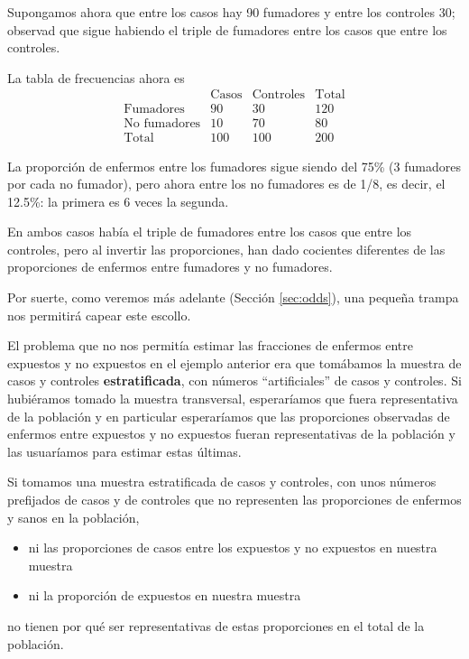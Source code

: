 \documentclass[
]{book}
\providecommand{\tightlist}{%
  \setlength{\itemsep}{0pt}\setlength{\parskip}{0pt}}
\theoremstyle{definition}
\theoremstyle{definition}
\theoremstyle{definition}
\theoremstyle{definition}
\theoremstyle{remark}
\begin{document}
Supongamos ahora que entre los casos hay 90 fumadores y entre los controles 30; observad que sigue habiendo el triple de fumadores entre los casos que entre los controles.

La tabla de frecuencias ahora es
\[
\begin{array}{r|c|c|c}
& \text{Casos} & \text{Controles} & \text{Total} \\ \hline
\text{Fumadores} & 90 & 30 & 120\\ \hline
\text{No fumadores} & 10 & 70 & 80\\ \hline
\text{Total} & 100 & 100 & 200
\end{array}
\]

La proporción de enfermos entre los fumadores sigue siendo del 75\% (3 fumadores por cada no fumador), pero ahora entre los no fumadores es de 1/8, es decir, el 12.5\%: la primera es 6 veces la segunda.

En ambos casos había el triple de fumadores entre los casos que entre los controles, pero al invertir las proporciones, han dado cocientes diferentes de las proporciones de enfermos entre fumadores y no fumadores.

Por suerte, como veremos más adelante (Sección \ref{sec:odds}), una pequeña trampa nos permitirá capear este escollo.

\begin{rmdimportant}
El problema que no nos permitía estimar las fracciones de enfermos entre expuestos y no expuestos en el ejemplo anterior era que tomábamos la muestra de casos y controles \textbf{estratificada}, con números ``artificiales'' de casos y controles. Si hubiéramos tomado la muestra transversal, esperaríamos que fuera representativa de la población y en particular esperaríamos que las proporciones observadas de enfermos entre expuestos y no expuestos fueran representativas de la población y las usuaríamos para estimar estas últimas.
\end{rmdimportant}

\begin{rmdcaution}
Si tomamos una muestra estratificada de casos y controles, con unos números prefijados de casos y de controles que no representen las proporciones de enfermos y sanos en la población,

\begin{itemize}
\tightlist
\item
  ni las proporciones de casos entre los expuestos y no expuestos en nuestra muestra
\item
  ni la proporción de expuestos en nuestra muestra
\end{itemize}

no tienen por qué ser representativas de estas proporciones en el total de la población.
\end{rmdcaution}
\end{document}
